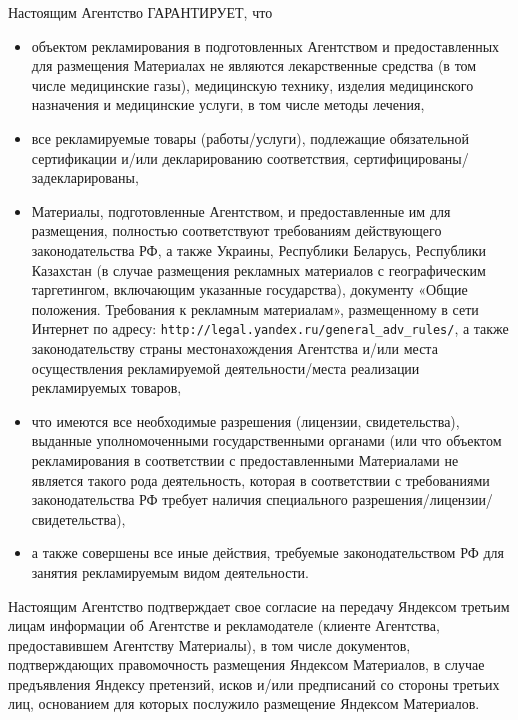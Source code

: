 \noindent
    Настоящим Агентство ГАРАНТИРУЕТ, что

\begin{itemize}
    \item объектом рекламирования в подготовленных Агентством и предоставленных для размещения Материалах не являются лекарственные средства (в том числе медицинские газы), медицинскую технику, изделия медицинского назначения и медицинские услуги, в том числе методы лечения,
    \item все рекламируемые товары (работы/услуги), подлежащие обязательной сертификации и/или декларированию соответствия, сертифицированы/задекларированы,
    \item Материалы, подготовленные Агентством, и предоставленные им для размещения, полностью соответствуют требованиям действующего законодательства РФ, а также Украины, Республики Беларусь, Республики Казахстан (в случае размещения рекламных материалов с географическим таргетингом, включающим указанные государства), документу «Общие положения. Требования к рекламным материалам», размещенному в сети Интернет по адресу: \lb \verb|http://legal.yandex.ru/general_adv_rules/|, а также законодательству страны местонахождения Агентства и/или места осуществления рекламируемой деятельности/места реализации рекламируемых товаров,
    \item что имеются все необходимые разрешения (лицензии, свидетельства), выданные уполномоченными государственными органами (или что объектом рекламирования в соответствии с предоставленными Материалами не является такого рода деятельность, которая в соответствии с требованиями законодательства РФ требует наличия специального разрешения/лицензии/свидетельства),
    \item а также совершены все иные действия, требуемые законодательством РФ для занятия рекламируемым видом деятельности.
\end{itemize}

\noindent
    Настоящим Агентство подтверждает свое согласие на передачу Яндексом третьим лицам информации об Агентстве и рекламодателе (клиенте Агентства, предоставившем Агентству Материалы), в том числе документов, подтверждающих правомочность  размещения Яндексом Материалов, в случае предъявления Яндексу претензий, исков и/или предписаний со стороны третьих лиц, основанием для которых послужило размещение Яндексом Материалов. 
\vspace{0.5em}

